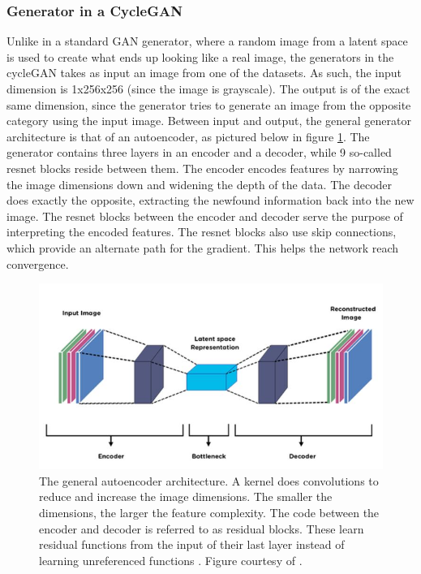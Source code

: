 \documentclass[12pt, fleqn, titlepage]{article}
\newcommand{\1}[1]{\mathds{1}\left[#1\right]}
\begin{document}
\subsubsection{Generator in a CycleGAN}
Unlike in a standard GAN generator, where a random image from a latent space is used to create what ends up looking like a real image, the generators in the cycleGAN takes as input an image from one of the datasets. As such, the input dimension is 1x256x256 (since the image is grayscale). The output is of the exact same dimension, since the generator tries to generate an image from the opposite category using the input image. Between input and output, the general generator architecture is that of an autoencoder, as pictured below in figure \ref{fig:autoencoder}. The generator contains three layers in an encoder and a decoder, while 9 so-called resnet blocks reside between them. The encoder encodes features by narrowing the image dimensions down and widening the depth of the data. The decoder does exactly the opposite, extracting the newfound information back into the new image. The resnet blocks between the encoder and decoder serve the purpose of interpreting the encoded features. The resnet blocks also use skip connections, which provide an alternate path for the gradient. This helps the network reach convergence.

\begin{figure}[H]
	\centering
	\includegraphics[width=0.7\linewidth]{imgs/autoencoder}
	\caption{The general autoencoder architecture. A kernel does convolutions to reduce and increase the image dimensions. The smaller the dimensions, the larger the feature complexity. The code between the encoder and decoder is referred to as residual blocks. These learn residual functions from the input of their last layer instead of learning unreferenced functions \cite{residual_blocks}. Figure courtesy of \cite{autoencoder}.}
	\label{fig:autoencoder}
\end{figure}
\end{document}
